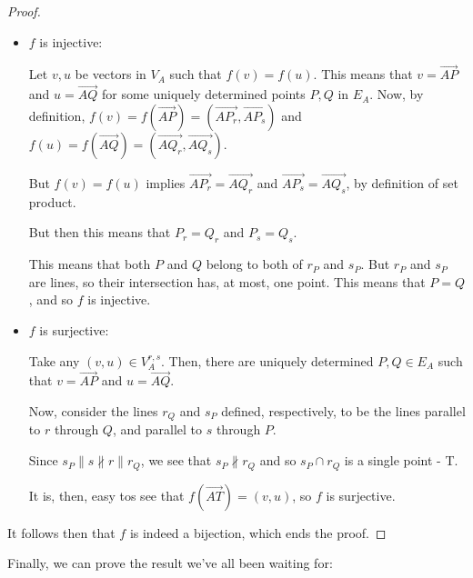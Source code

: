 \begin{proof}
	\begin{itemize}
		\item $f$ is injective:
		
		Let $v,u$ be vectors in $V_A$ such that $f(v)=f(u)$. This means that $v=\overrightarrow{AP}$ and $u=\overrightarrow{AQ}$ for some uniquely determined points $P,Q$ in $E_A$. Now, by definition, $f(v)=f(\overrightarrow{AP})=(\overrightarrow{AP_r},\overrightarrow{AP_s})$ and $f(u)=f(\overrightarrow{AQ})=(\overrightarrow{AQ_r},\overrightarrow{AQ_s})$.
		
		But $f(v)=f(u)$ implies $\overrightarrow{AP_r}=\overrightarrow{AQ_r}$ and $\overrightarrow{AP_s}=\overrightarrow{AQ_s}$, by definition of set product.
		
		But then this means that $P_r=Q_r$ and $P_s=Q_s$.
		
		This means that both $P$ and $Q$ belong to both of $r_P$ and $s_P$. But $r_P$ and $s_P$ are lines, so their intersection has, at most, one point. This means that $P=Q$, and so $f$ is injective.
		
		\item $f$ is surjective:
		
		Take any $(v,u)\in V^{r,s}_A$. Then, there are uniquely determined $P,Q\in E_A$ such that $v=\overrightarrow{AP}$ and $u=\overrightarrow{AQ}$.
		
		Now, consider the lines $r_Q$ and $s_P$ defined, respectively, to be the lines parallel to $r$ through $Q$, and parallel to $s$ through $P$.
		
		Since $s_P\parallel s\nparallel r\parallel r_Q$, we see that $s_P\nparallel r_Q$ and so $s_P\cap r_Q$ is a single point - T.
		
		It is, then, easy tos see that $f(\overrightarrow{AT})=(v,u)$, so $f$ is surjective.
	\end{itemize}

It follows then that $f$ is indeed a bijection, which ends the proof.
\end{proof}

Finally, we can prove the result we've all been waiting for:

